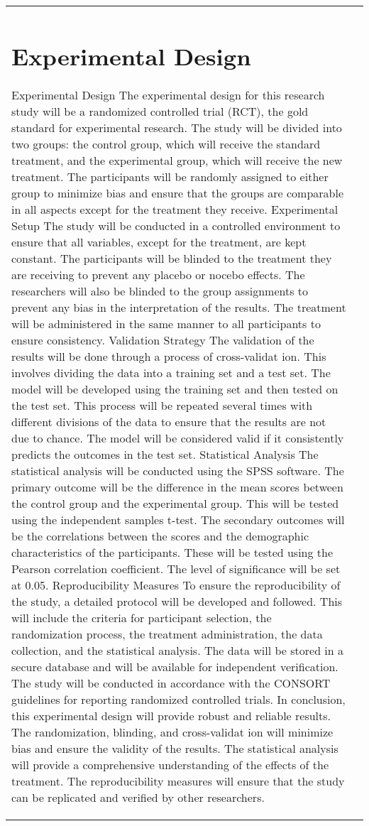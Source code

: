 \documentclass[conference]{IEEEtran}
\begin{document}
\begin{table}[htbp]
\begin{tabular}{|l|c|}
\section{Experimental Design}
Experimental Design The experimental design for this research study will be a randomized controlled trial (RCT), the gold standard for experimental research. The study will be divided into two groups: the control group, which will receive the standard treatment, and the experimental group, which will receive the new treatment. The participants will be randomly assigned to either group to minimize bias and ensure that the groups are comparable in all aspects except for the treatment they receive. Experimental Setup The study will be conducted in a controlled environment to ensure that all variables, except for the treatment, are kept constant. The participants will be blinded to the treatment they are receiving to prevent any placebo or nocebo effects. The researchers will also be blinded to the group assignments to prevent any bias in the interpretation of the results. The treatment will be administered in the same manner to all participants to ensure consistency. Validation Strategy The validation of the results will be done through a process of cross-validat ion. This involves dividing the data into a training set and a test set. The model will be developed using the training set and then tested on the test set. This process will be repeated several times with different divisions of the data to ensure that the results are not due to chance. The model will be considered valid if it consistently predicts the outcomes in the test set. Statistical Analysis The statistical analysis will be conducted using the SPSS software. The primary outcome will be the difference in the mean scores between the control group and the experimental group. This will be tested using the independent samples t-test. The secondary outcomes will be the correlations between the scores and the demographic characteristics of the participants. These will be tested using the Pearson correlation coefficient. The level of significance will be set at 0.05. Reproducibility Measures To ensure the reproducibility of the study, a detailed protocol will be developed and followed. This will include the criteria for participant selection, the randomization process, the treatment administration, the data collection, and the statistical analysis. The data will be stored in a secure database and will be available for independent verification. The study will be conducted in accordance with the CONSORT guidelines for reporting randomized controlled trials. In conclusion, this experimental design will provide robust and reliable results. The randomization, blinding, and cross-validat ion will minimize bias and ensure the validity of the results. The statistical analysis will provide a comprehensive understanding of the effects of the treatment. The reproducibility measures will ensure that the study can be replicated and verified by other researchers.


\end{tabular}
\end{table}
\end{document}
